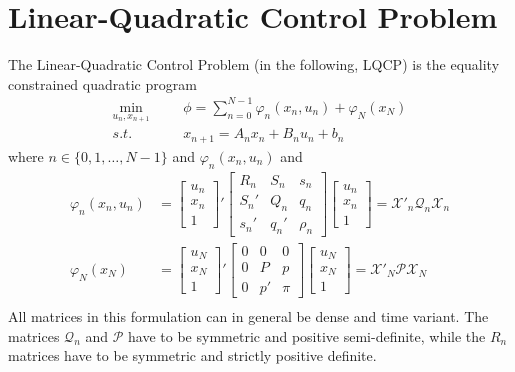 \documentclass[a4paper]{report}
\begin{document}
\section{Linear-Quadratic Control Problem}

The Linear-Quadratic Control Problem (in the following, LQCP) is the equality constrained quadratic program
\begin{equation}
\begin{aligned}
\min_{u_n,x_{n+1}} &&& \phi = \sum_{n=0}^{N-1} \varphi_n(x_n,u_n) + \varphi_N(x_N) \\
s.t. &&& x_{n+1} = A_nx_n+B_nu_n+b_n
\end{aligned}
\label{lqcp}
\end{equation}
where $n\in\{0,1,\dots,N-1\}$ and $\varphi_n(x_n,u_n)$ and
\begin{equation}
\begin{aligned}
\varphi_n(x_n,u_n) &= \begin{bmatrix} u_n \\ x_n \\ 1 \end{bmatrix}' \begin{bmatrix} R_n&S_n&s_n \\ S_n'&Q_n&q_n \\ s_n'&q_n'& \rho_n \end{bmatrix} \begin{bmatrix} u_n \\ x_n \\ 1 \end{bmatrix}  = \mathcal{X}'_n\mathcal{Q}_n\mathcal{X}_n \\
\varphi_N(x_N) &= \begin{bmatrix} u_N \\ x_N \\ 1 \end{bmatrix}' \begin{bmatrix} 0&0&0 \\ 0&P&p \\ 0&p'&\pi \end{bmatrix} \begin{bmatrix} u_N \\ x_N \\ 1 \end{bmatrix} = \mathcal{X}'_N\mathcal{P}\mathcal{X}_N\\ 
\end{aligned}
\label{cflq}
\end{equation}
All matrices in this formulation can in general be dense and time variant. The matrices $\mathcal Q_n$ and $\mathcal P$ have to be symmetric and positive semi-definite, while the $R_n$ matrices have to be symmetric and strictly positive definite.
\end{document}
